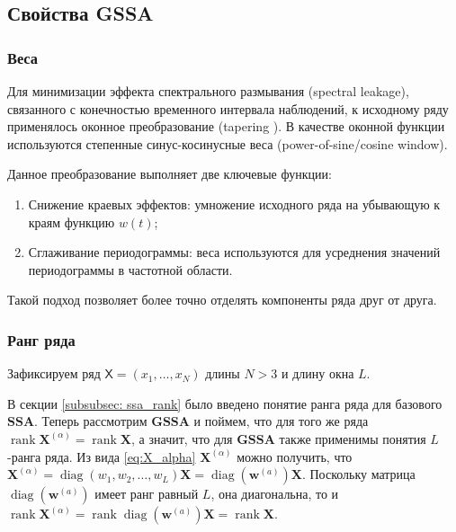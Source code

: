 \documentclass[a4paper, 11pt]{article}
\newcommand{\SSA}{\textbf{SSA}}
\newcommand{\GSSA}{\textbf{GSSA}}
\newcommand{\TS}{\mathsf{X}}
\begin{document}
\subsection{Свойства GSSA}

\subsubsection{Веса}

Для минимизации эффекта спектрального размывания (spectral leakage), связанного с конечностью временного интервала наблюдений, к исходному ряду применялось оконное преобразование (tapering \cite{weisstein2002crc}). В качестве оконной функции используются степенные синус-косинусные веса (power-of-sine/cosine window). 

Данное преобразование выполняет две ключевые функции:
\begin{enumerate}
	\item Снижение краевых эффектов: умножение исходного ряда на убывающую к краям функцию \( w(t) \);
	\item Сглаживание периодограммы: веса используются для усреднения значений периодограммы в частотной области.
\end{enumerate}

Такой подход позволяет более точно отделять компоненты ряда друг от друга.


\subsubsection{Ранг ряда}
Зафиксируем ряд $\TS = (x_1, \dots, x_{N})$ длины $N > 3$ и длину окна $L$. 


В секции \ref{subsubsec: ssa_rank} было введено понятие ранга ряда для базового $\SSA$.
Теперь рассмотрим $\GSSA$ и поймем, что для того же ряда $\operatorname{rank} \mathbf{X}^{(\alpha)} = \operatorname{rank} \mathbf{X}$, а значит, что для $\GSSA$ также применимы понятия $L$-ранга ряда. Из вида \eqref{eq:X_alpha} $\mathbf{X}^{(\alpha)}$ можно получить, что $\mathbf{X}^{(\alpha)} = \operatorname{diag}\left(w_1, w_2, \dots, w_L \right) \mathbf{X} = \operatorname{diag}\left({\boldsymbol{w}}^{(a)}\right) \mathbf{X}$. Поскольку матрица $\operatorname{diag}\left({\boldsymbol{w}}^{(a)}\right)$ имеет ранг равный $L$, она диагональна, то и $\operatorname{rank} \mathbf{X}^{(\alpha)} = \operatorname{rank} \operatorname{diag}\left({\boldsymbol{w}}^{(a)}\right)\mathbf{X} = \operatorname{rank} \mathbf{X}$.
\end{document}
